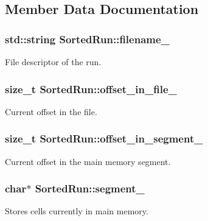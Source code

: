 \subsection{Member Data Documentation}
\hypertarget{classSortedRun_a47af8318f28ffc3242e8b0a5d7ddb9fc}{}
\subsubsection[{filename\+\_\+}]{\setlength{\rightskip}{0pt plus 5cm}std\+::string Sorted\+Run\+::filename\+\_\+\hspace{0.3cm}{\ttfamily [private]}}\label{classSortedRun_a47af8318f28ffc3242e8b0a5d7ddb9fc}
File descriptor of the run. \hypertarget{classSortedRun_a9a20d3bda0e5cccbcfa4cf84caae26d2}{}
\subsubsection[{offset\+\_\+in\+\_\+file\+\_\+}]{\setlength{\rightskip}{0pt plus 5cm}size\+\_\+t Sorted\+Run\+::offset\+\_\+in\+\_\+file\+\_\+\hspace{0.3cm}{\ttfamily [private]}}\label{classSortedRun_a9a20d3bda0e5cccbcfa4cf84caae26d2}
Current offset in the file. \hypertarget{classSortedRun_ad937ca2a46e822d767b465369b65dff5}{}
\subsubsection[{offset\+\_\+in\+\_\+segment\+\_\+}]{\setlength{\rightskip}{0pt plus 5cm}size\+\_\+t Sorted\+Run\+::offset\+\_\+in\+\_\+segment\+\_\+\hspace{0.3cm}{\ttfamily [private]}}\label{classSortedRun_ad937ca2a46e822d767b465369b65dff5}
Current offset in the main memory segment. \hypertarget{classSortedRun_a7b337cb68dd655e645fc6d6096f55721}{}
\subsubsection[{segment\+\_\+}]{\setlength{\rightskip}{0pt plus 5cm}char$\ast$ Sorted\+Run\+::segment\+\_\+\hspace{0.3cm}{\ttfamily [private]}}\label{classSortedRun_a7b337cb68dd655e645fc6d6096f55721}
Stores cells currently in main memory. \hypertarget{classSortedRun_a713facebc827efc8f48d784d970531df}{}
